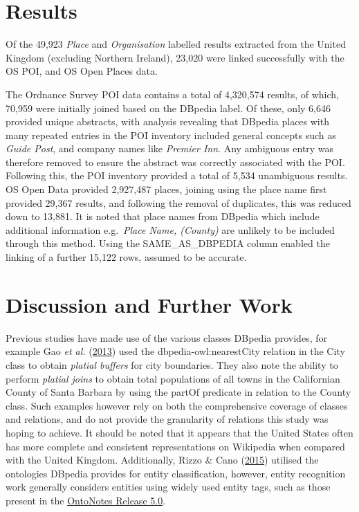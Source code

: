 \documentclass[10pt,]{article}
\renewcommand\texttt[1]{{\ttfamily\color{ttcolor}#1}}
\begin{document}
\hypertarget{results}{%
\section{Results}\label{results}}

Of the 49,923 \emph{Place} and \emph{Organisation} labelled results
extracted from the United Kingdom (excluding Northern Ireland), 23,020
were linked successfully with the OS POI, and OS Open Places data.

The Ordnance Survey POI data contains a total of 4,320,574 results, of
which, 70,959 were initially joined based on the DBpedia label. Of
these, only 6,646 provided unique abstracts, with analysis revealing
that DBpedia places with many repeated entries in the POI inventory
included general concepts such as \emph{Guide Post}, and company names
like \emph{Premier Inn}. Any ambiguous entry was therefore removed to
ensure the abstract was correctly associated with the POI. Following
this, the POI inventory provided a total of 5,534 unambiguous results.
OS Open Data provided 2,927,487 places, joining using the place name
first provided 29,367 results, and following the removal of duplicates,
this was reduced down to 13,881. It is noted that place names from
DBpedia which include additional information e.g.~\emph{Place Name,
(County)} are unlikely to be included through this method. Using the
\texttt{SAME\_AS\_DBPEDIA} column enabled the linking of a further
15,122 rows, assumed to be accurate.

\hypertarget{discussion-and-further-work}{%
\section{Discussion and Further
Work}\label{discussion-and-further-work}}

Previous studies have made use of the various classes DBpedia provides,
for example Gao \emph{et al.} (\protect\hyperlink{ref-gao2013}{2013})
used the \texttt{dbpedia-owl:nearestCity} relation in the \texttt{City}
class to obtain \emph{platial buffers} for city boundaries. They also
note the ability to perform \emph{platial joins} to obtain total
populations of all towns in the Californian County of Santa Barbara by
using the \texttt{partOf} predicate in relation to the \texttt{County}
class. Such examples however rely on both the comprehensive coverage of
classes and relations, and do not provide the granularity of relations
this study was hoping to achieve. It should be noted that it appears
that the United States often has more complete and consistent
representations on Wikipedia when compared with the United Kingdom.
Additionally, Rizzo \& Cano (\protect\hyperlink{ref-rizzo2015}{2015})
utilised the ontologies DBpedia provides for entity classification,
however, entity recognition work generally considers entities using
widely used entity tags, such as those present in the
\href{https://catalog.ldc.upenn.edu/LDC2013T19}{OntoNotes Release 5.0}.
\end{document}
